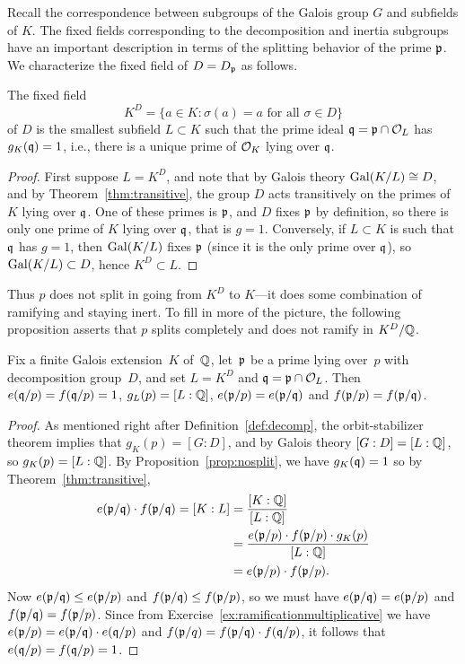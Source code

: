 Recall the correspondence between subgroups of the Galois group
$G$ and subfields of $K$. The fixed fields corresponding to the
decomposition and inertia subgroups have an important description
in terms of the splitting behavior of the prime $\mathfrak{p}$.
We characterize the fixed field of $D=D_{\mathfrak{p}}$ as follows.

\begin{proposition}\label{prop:nosplit}
	The fixed field
	$$
		K^D=\{a \in K : \sigma(a) = a\text{ for all }\sigma \in D\}
	$$
	of $D$
	is the smallest subfield $L\subset K$ such that
	the prime ideal $\mathfrak{q} = \mathfrak{p}\cap\mathcal{O}_L$
	has $g_K(\mathfrak{q})=1$, i.e., there is a unique
	prime of $\mathcal{O}_K$ lying over $\mathfrak{q}$.
\end{proposition}
\begin{proof}
	First suppose $L=K^D$, and note that by Galois theory $\operatorname{Gal}(K/L)\cong
	D$, and by Theorem~\ref{thm:transitive}, the group $D$
	acts transitively on the primes of $K$ lying over $\mathfrak{q}$.  One of
	these primes is $\mathfrak{p}$, and $D$ fixes $\mathfrak{p}$ by definition, so there is
	only one prime of $K$ lying over $\mathfrak{q}$, that is $g=1$.
	Conversely, if $L\subset K$ is such that $\mathfrak{q}$
	has $g=1$, then $\operatorname{Gal}(K/L)$ fixes $\mathfrak{p}$ (since it is the only
	prime over $\mathfrak{q}$), so $\operatorname{Gal}(K/L)\subset D$, hence $K^D\subset L$.
\end{proof}

Thus $p$ does not split in going from $K^D$ to $K$---it does some
combination of ramifying and staying inert.  To fill in more of
the picture, the following proposition asserts that $p$ splits
completely and does not ramify in $K^D/\mathbb{Q}$.

\begin{proposition}\label{prop:noresidue}
	Fix a finite Galois extension~$K$ of~$\mathbb{Q}$,
	let~$\mathfrak{p}$ be a prime lying over~$p$ with decomposition group~$D$,
	and set $L=K^D$ and $\mathfrak{q} = \mathfrak{p} \cap \mathcal{O}_L$.
	Then $e(\mathfrak{q}/p)=f(\mathfrak{q}/p)=1$, $g_L(p)=[L : \mathbb{Q}]$,
	$e(\mathfrak{p}/p)=e(\mathfrak{p}/\mathfrak{q})$ and $f(\mathfrak{p}/p)=f(\mathfrak{p}/\mathfrak{q})$.
\end{proposition}
\begin{proof}
	As mentioned right after Definition~\ref{def:decomp}, the
	orbit-stabilizer theorem implies that $g_K(p)=[G:D]$, and
	by Galois theory $[G:D]=[L:\mathbb{Q}]$, so $g_K(p) = [L:\mathbb{Q}]$. By
	Proposition~\ref{prop:nosplit}, we have $g_K(\mathfrak{q})=1$ so
	by Theorem~\ref{thm:transitive},
	\begin{align*}
		e(\mathfrak{p}/\mathfrak{q}) \cdot f(\mathfrak{p}/\mathfrak{q}) = [K:L]
		&=\frac{[K:\mathbb{Q}]}{[L:\mathbb{Q}]} \\
		&= \frac{e(\mathfrak{p}/p)\cdot f(\mathfrak{p}/p) \cdot g_K(p)}{[L:\mathbb{Q}]}
		\\
		&= e(\mathfrak{p}/p)\cdot f(\mathfrak{p}/p).
	\end{align*}
	Now $e(\mathfrak{p}/\mathfrak{q})\leq e(\mathfrak{p}/p)$ and $f(\mathfrak{p}/\mathfrak{q})\leq f(\mathfrak{p}/p)$, so
	we must have $e(\mathfrak{p}/\mathfrak{q})=e(\mathfrak{p}/p)$ and $f(\mathfrak{p}/\mathfrak{q})=f(\mathfrak{p}/p)$.
	Since from Exercise~\ref{ex:ramificationmultiplicative} we have
	$e(\mathfrak{p}/p)=e(\mathfrak{p}/\mathfrak{q})\cdot e(\mathfrak{q}/p)$ and $f(\mathfrak{p}/q)=f(\mathfrak{p}/\mathfrak{q})\cdot f(\mathfrak{q}/p)$,
	it follows that $e(\mathfrak{q}/p)=f(\mathfrak{q}/p) = 1$.
\end{proof}

